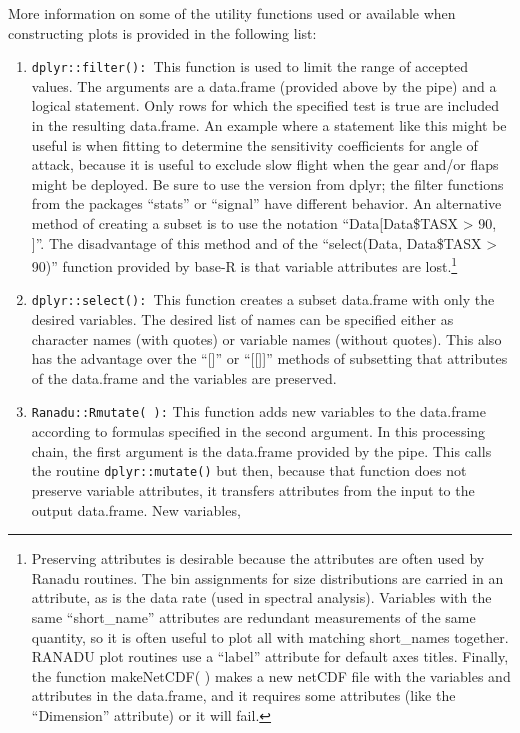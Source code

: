 \documentclass[12pt,english]{report}\usepackage[]{graphicx}\usepackage[]{color}
\begin{document}
More information on some of the utility functions used or available
when constructing plots is provided in the following list:
\begin{enumerate}
\item \texttt{dplyr::filter(): }This function is used to limit the range
of accepted values. The arguments are a data.frame (provided above
by the pipe) and a logical statement. Only rows for which the specified
test is true are included in the resulting data.frame. An example
where a statement like this might be useful is when fitting to determine
the sensitivity coefficients for angle of attack, because it is useful
to exclude slow flight when the gear and/or flaps might be deployed.
Be sure to use the version from dplyr; the filter functions from the
packages ``stats'' or ``signal'' have different behavior. An alternative
method of creating a subset is to use the notation ``Data{[}Data\$TASX
> 90, {]}''. The disadvantage of this method and of the ``select(Data,
Data\$TASX > 90)'' function provided by base-R is that variable attributes
are lost.\footnote{Preserving attributes is desirable because the attributes are often
used by Ranadu routines. The bin assignments for size distributions
are carried in an attribute, as is the data rate (used in spectral
analysis). Variables with the same ``short\_name'' attributes are
redundant measurements of the same quantity, so it is often useful
to plot all with matching short\_names together. RANADU plot routines
use a ``label'' attribute for default axes titles. Finally, the
function makeNetCDF( ) makes a new netCDF file with the variables
and attributes in the data.frame, and it requires some attributes
(like the ``Dimension'' attribute) or it will fail.}
\item \texttt{dplyr::select(): }This function creates a subset data.frame
with only the desired variables. The desired list of names can be
specified either as character names (with quotes) or variable names
(without quotes). This also has the advantage over the ``{[}{]}''
or ``{[}{[}{]}{]}'' methods of subsetting that attributes of the
data.frame and the variables are preserved.
\item \texttt{Ranadu::Rmutate( ):} This function adds new variables to the
data.frame according to formulas specified in the second argument.
In this processing chain, the first argument is the data.frame provided
by the pipe. This calls the routine \texttt{dplyr::mutate()} but then,
because that function does not preserve variable attributes, it transfers
attributes from the input to the output data.frame. New variables,

\end{enumerate}
\end{document}

